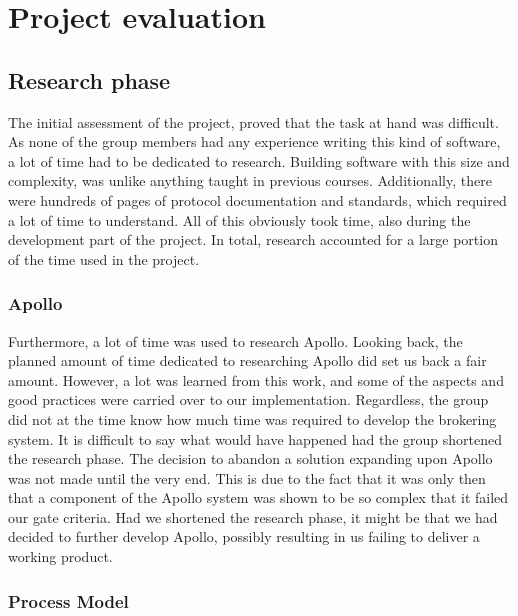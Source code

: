 
\chapter{Project evaluation}

\section{Research phase}

The initial assessment of the project, proved that the task at hand was difficult. As none of the group members had any experience writing this kind of software, a lot of time had to be dedicated to research. Building software with this size and complexity, was unlike anything taught in previous courses. Additionally, there were hundreds of pages of protocol documentation and standards, which required a lot of time to understand. All of this obviously took time, also during the development part of the project. In total, research accounted for a large portion of the time used in the project.

\subsection{Apollo}

Furthermore, a lot of time was used to research Apollo. Looking back, the planned amount of time dedicated to researching Apollo did set us back a fair amount. However, a lot was learned from this work, and some of the aspects and good practices were carried over to our implementation. Regardless, the group did not at the time know how much time was required to develop the brokering system. It is difficult to say what would have happened had the group shortened the research phase. The decision to abandon a solution expanding upon Apollo was not made until the very end. This is due to the fact that it was only then that a component of the Apollo system was shown to be so complex that it failed our gate criteria. Had we shortened the research phase, it might be that we had decided to further develop Apollo, possibly resulting in us failing to deliver a working product.


\subsection{Process Model}

